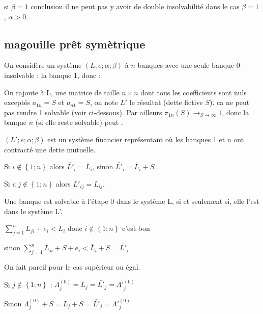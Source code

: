\documentclass[11pt,oneside,twocolumn]{article}
\begin{document}
si $\beta=1$
conclusion il ne peut pas y avoir de double insolvabilité dans le cas $\beta=1$, $\alpha >0$.

\subsection{magouille prêt symètrique}
On considère un système $(L; e ; \alpha ; \beta)$ à $n$ banques avec une seule banque 0-insolvable : la banque 1, donc :


On rajoute à L, une matrice de taille $n\times n$  dont tous les coefficients sont nuls exceptés $a_{1n}=S$ et $a_{n1}=S$, on note $L'$ le résultat (dette fictive $S$). ca ne peut pas rendre 1 solvable (voir ci-dessous). Par ailleurs 
$\pi_{1n}(S)\to_{S\to\infty} 1$,
donc la banque $n$ (si elle reste solvable)
peut .

$(L'; e ; \alpha ; \beta)$ est un système financier représentant où les banques 1 et n ont contracté une dette mutuelle.


Si $i \notin \left\lbrace 1; n \right\rbrace$ alors $\bar{L'}_{i} = \bar{L}_{i}$, sinon $\bar{L'}_{i} = \bar {L}_{i} + S$

Si $i;j \notin \left\lbrace 1; n \right\rbrace$ alors $L'_{ij} = L_{ij}$.


Une banque est solvable à l'étape 0 dans le système L, si et seulement si, elle l'est dans le système L'.


$\sum_{j=1}^{n} L_{ji} + e_{i} <  \bar{L}_{i}$ donc $i \notin \left\lbrace 1; n \right\rbrace$ c'est bon

sinon $\sum_{j=1}^{n} L_{ji} + S + e_{i} <  \bar{L}_{i} + S = \bar{L'}_{i}$
 
On fait pareil pour le cas supérieur ou égal.

\begin{center}
Si $j \notin \left\lbrace 1; n \right\rbrace$ : $\Lambda^{(0)}_{j} = \bar{L}_{j} = \bar{L'}_{j} = \Lambda'^{(0)}_{j} $

Sinon $\Lambda^{(0)}_{j} + S = \bar{L}_{j} + S = \bar{L'}_{j} = \Lambda'^{(0)}_{j} $
\end{center}
\end{document}
